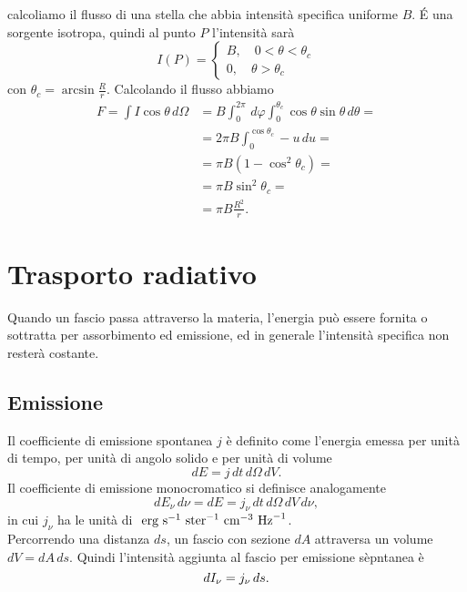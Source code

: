 calcoliamo il flusso di una stella che abbia intensità specifica uniforme $B$. \'E una sorgente isotropa, quindi al punto $P$ l'intensità sarà
\begin{equation*}
    I(P)=
    \begin{cases}
    B,\quad 0<\theta<\theta_c\\
    0,\quad \theta>\theta_c
    \end{cases}
\end{equation*}
con $\theta_c =\arcsin\frac{R}{r}$. Calcolando il flusso abbiamo
\begin{align*}
    F=\int I\cos\theta\,d\Omega &= B\int_{0}^{2\pi}\,d\varphi\int_{0}^{\theta_c}\cos\theta\sin\theta\,d\theta =\\
    &=2\pi B\int_{0}^{\cos\theta_c}-u\,du=\\
    &=\pi B(1-\cos^2\theta_c)=\\
    &=\pi B \sin^2\theta_c=\\
    &=\pi B \frac{R^2}{r}.
\end{align*}

\section{Trasporto radiativo}
Quando un fascio passa attraverso la materia, l'energia può essere fornita o sottratta per assorbimento ed emissione, ed in generale l'intensità specifica non resterà costante.
\subsection{Emissione}
Il coefficiente di emissione spontanea $j$ è definito come l'energia emessa per unità di tempo, per unità di angolo solido e per unità di volume
\begin{equation*}
    dE = j\,dt\,d\Omega\,dV.
\end{equation*}
Il coefficiente di emissione monocromatico si definisce analogamente
\begin{equation*}
    dE_\nu\, d\nu = dE = j_\nu\, dt\, d\Omega\,dV\,d\nu,
\end{equation*}
in cui $j_\nu$ ha le unità di $\text{ erg}\text{ s}^{-1}\text{ ster}^{-1}\text{ cm}^{-3}\text{ Hz}^{-1}$.\\
Percorrendo una distanza $ds$, un fascio con sezione $dA$ attraversa un volume $dV=dA\,ds$. Quindi l'intensità aggiunta al fascio per emissione sèpntanea è
\begin{equation}
    dI_\nu = j_\nu\,ds.
    \label{004}
\end{equation}

